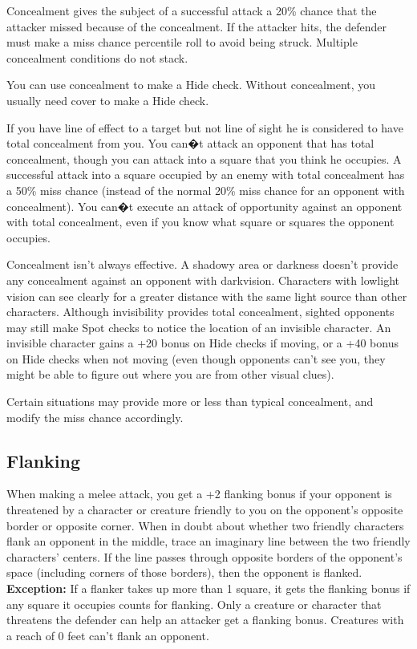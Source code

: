 \vspace*{10pt}

Concealment gives the subject of a successful attack a 20\% chance that the attacker missed because of the concealment. If the attacker hits, the defender must make a miss chance percentile roll to avoid being struck. Multiple concealment conditions do not stack.

You can use concealment to make a Hide check. Without concealment, you usually need cover to make a Hide check.

If you have line of effect to a target but not line of sight he is considered to have total concealment from you. You can�t attack an opponent that has total concealment, though you can attack into a square that you think he occupies. A successful attack into a square occupied by an enemy with total concealment has a 50\% miss chance (instead of the normal 20\% miss chance for an opponent with concealment). You can�t execute an attack of opportunity against an opponent with total concealment, even if you know what square or squares the opponent occupies.

Concealment isn't always effective. A shadowy area or darkness doesn't provide any concealment against an opponent with darkvision. Characters with low\textendash light vision can see clearly for a greater distance with the same light source than other characters. Although invisibility provides total concealment, sighted opponents may still make Spot checks to notice the location of an invisible character. An invisible character gains a +20 bonus on Hide checks if moving, or a +40 bonus on Hide checks when not moving (even though opponents can't see you, they might be able to figure out where you are from other visual clues).

Certain situations may provide more or less than typical concealment, and modify the miss chance accordingly.

\subsection{Flanking}

When making a melee attack, you get a +2 flanking bonus if your opponent is threatened by a character or creature friendly to you on the opponent's opposite border or opposite corner. When in doubt about whether two friendly characters flank an opponent in the middle, trace an imaginary line between the two friendly characters' centers. If the line passes through opposite borders of the opponent's space (including corners of those borders), then the opponent is flanked. 
\textbf{Exception:} If a flanker takes up more than 1 square, it gets the flanking bonus if any square it occupies counts for flanking. Only a creature or character that threatens the defender can help an attacker get a flanking bonus. Creatures with a reach of 0 feet can't flank an opponent.

